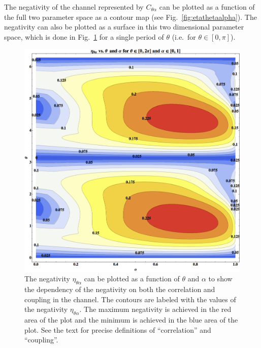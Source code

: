 The negativity of the channel represented by $C_{\theta\alpha}$ can be plotted as a function of the full two parameter space as a contour map (see Fig.\ \ref{fig:etathetaalpha}).  The negativity can also be plotted as a surface in this two dimensional parameter space, which is done in Fig.\ \ref{fig:etathetaalphaAlso} for a single period of $\theta$ (i.e.\ for $\theta\in[0,\pi]$).
\begin{figure}[h!t]
\centering
\includegraphics[scale=0.32]{eatthetaalphaII.png}
\caption{The negativity $\eta_{\theta\alpha}$ can be plotted as a function of $\theta$ and $\alpha$ to show the dependency of the negativity on both the correlation and coupling in the channel.  The contours are labeled with the values of the negativity $\eta_{\theta\alpha}$.  The maximum negativity is achieved in the red area of the plot and the minimum is achieved in the blue area of the plot.  See the text for precise definitions of ``correlation'' and ``coupling''. }
\label{fig:etathetaalphaAlso}
\end{figure}
